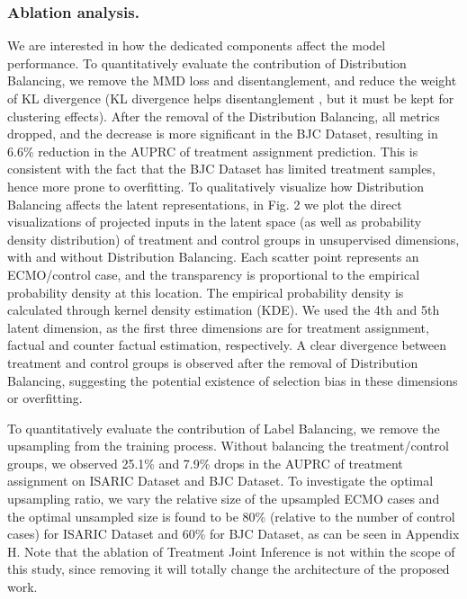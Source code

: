 \subsubsection{Ablation analysis.} 
We are interested in how the dedicated components affect the model performance. To quantitatively evaluate the contribution of Distribution Balancing, we remove the MMD loss and disentanglement, and reduce the weight of KL divergence (KL divergence helps disentanglement \cite{higgins2017beta}, but it must be kept for clustering effects). After the removal of the Distribution Balancing, all metrics dropped, and the decrease is more significant in the BJC Dataset, resulting in 6.6\% reduction in the AUPRC of treatment assignment prediction. This is consistent with the fact that the BJC Dataset has limited treatment samples, hence more prone to overfitting. To qualitatively visualize how Distribution Balancing affects the latent representations, in Fig. 2 we plot the direct visualizations of projected inputs in the latent space (as well as probability density distribution) of treatment and control groups in unsupervised dimensions, with and without Distribution Balancing. Each scatter point represents an ECMO/control case, and the transparency is proportional to the empirical probability density at this location. The empirical probability density is calculated through kernel density estimation (KDE). We used the 4th and 5th latent dimension, as the first three dimensions are for treatment assignment, factual and counter factual estimation, respectively. A clear divergence between treatment and control groups is observed after the removal of Distribution Balancing, suggesting the potential existence of selection bias in these dimensions or overfitting. 

To quantitatively evaluate the contribution of Label Balancing, we remove the upsampling from the training process. Without balancing the treatment/control groups, we observed 25.1\% and 7.9\% drops in the AUPRC of treatment assignment on ISARIC Dataset and BJC Dataset. To investigate the optimal upsampling ratio,  we vary the relative size of the upsampled ECMO cases and the optimal unsampled size is found to be 80\% (relative to the number of control cases) for ISARIC Dataset and 60\% for BJC Dataset, as can be seen in Appendix H. 
Note that the ablation of Treatment Joint Inference is not within the scope of this study, since removing it will totally change the architecture of the proposed work. 


